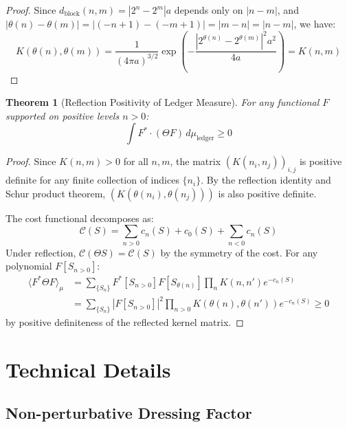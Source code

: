 \documentclass[11pt]{article}
\numberwithin{equation}{section}
\newtheorem{theorem}{Theorem}[section]
\theoremstyle{definition}
\theoremstyle{remark}
\begin{document}
\begin{proof}
Since $d_{\text{block}}(n,m) = |2^n - 2^m|a$ depends only on $|n-m|$, and $|\theta(n) - \theta(m)| = |(-n+1) - (-m+1)| = |m-n| = |n-m|$, we have:
\begin{equation}
K(\theta(n), \theta(m)) = \frac{1}{(4\pi a)^{3/2}} \exp\left(-\frac{|2^{\theta(n)} - 2^{\theta(m)}|^2 a^2}{4a}\right) = K(n,m)
\end{equation}
\end{proof}

\begin{theorem}[Reflection Positivity of Ledger Measure]
For any functional $F$ supported on positive levels $n > 0$:
\begin{equation}
\int F^* \cdot (\Theta F) \, d\mu_{\text{ledger}} \geq 0
\end{equation}
\end{theorem}

\begin{proof}
Since $K(n,m) > 0$ for all $n,m$, the matrix $(K(n_i, n_j))_{i,j}$ is positive definite for any finite collection of indices $\{n_i\}$. By the reflection identity and Schur product theorem, $(K(\theta(n_i), \theta(n_j)))$ is also positive definite.

The cost functional decomposes as:
\begin{equation}
\mathcal{C}(S) = \sum_{n > 0} c_n(S) + c_0(S) + \sum_{n < 0} c_n(S)
\end{equation}
Under reflection, $\mathcal{C}(\Theta S) = \mathcal{C}(S)$ by the symmetry of the cost. For any polynomial $F[S_{n>0}]$:
\begin{align}
\langle F^* \Theta F \rangle_{\mu} &= \sum_{\{S_n\}} F^*[S_{n>0}] F[S_{\theta(n)}] \prod_n K(n,n') e^{-c_n(S)} \\
&= \sum_{\{S_n\}} |F[S_{n>0}]|^2 \prod_{n>0} K(\theta(n), \theta(n')) e^{-c_n(S)} \geq 0
\end{align}
by positive definiteness of the reflected kernel matrix.
\end{proof}

\section{Technical Details}
\label{app:technical}

\subsection{Non-perturbative Dressing Factor}
\end{document}
